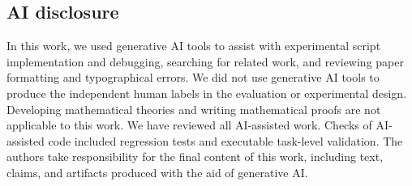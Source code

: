 \subsection*{AI disclosure}

In this work, we used generative AI tools to assist with experimental script implementation and debugging, searching for related work, and reviewing paper formatting and typographical errors. We did not use generative AI tools to produce the independent human labels in the evaluation or experimental design. Developing mathematical theories and writing mathematical proofs are not applicable to this work. We have reviewed all AI-assisted work. Checks of AI-assisted code included regression tests and executable task-level validation. The authors take responsibility for the final content of this work, including text, claims, and artifacts produced with the aid of generative AI.

